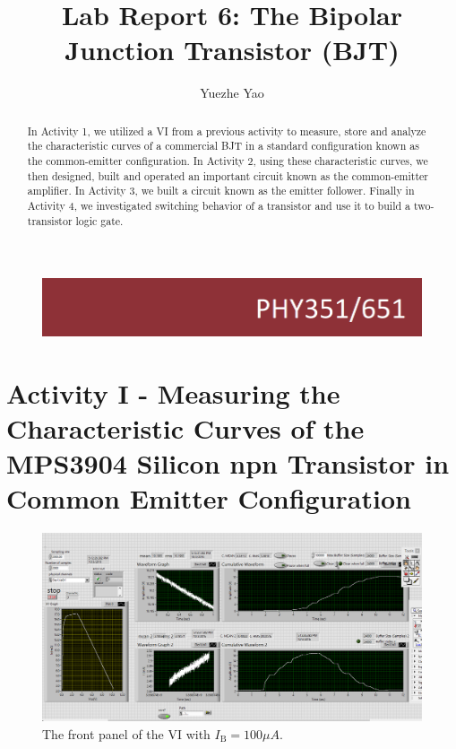 \documentclass[11pt]{article}
\begin{document}
\begin{figure}
  \includegraphics[width=\linewidth/3]{title}
  \label{fig:title}
\end{figure}


\title{Lab Report 6: The Bipolar Junction Transistor (BJT)}


\author{Yuezhe Yao}




\maketitle

\begin{abstract}
In Activity 1, we utilized a VI from a previous activity to 
measure, store and analyze the characteristic curves of a commercial BJT in a standard configuration known as the common-emitter configuration. In Activity 2, using these characteristic curves, we then designed, built and operated an important circuit known as the common-emitter amplifier. In Activity 3, we built a circuit known as the emitter follower. Finally in Activity 4, we investigated switching behavior of a transistor and use it to build a two-transistor logic gate.            
\end{abstract}

\medskip

\begingroup
\let\clearpage\relax
\tableofcontents
\endgroup

\medskip
\medskip


\section{Activity I - Measuring the Characteristic Curves of the MPS3904 Silicon npn Transistor in Common Emitter Configuration}

\begin{figure}[H]
 \begin{center}
  \includegraphics[width=\linewidth/1]{act1IB100}
  \caption{The front panel of the VI with $I_{\mathrm{B}}=100\mu A$.}
  \label{fig:act1IB100}
 \end{center}
\end{figure}
\end{document}

